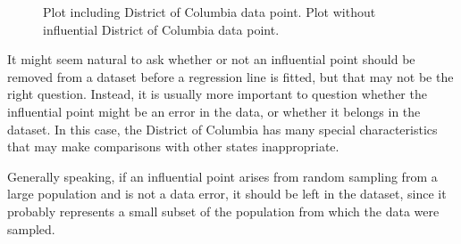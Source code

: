 \begin{figure}[h!]
	\centering
	\caption{ Plot including District of Columbia data point.  Plot without influential District of Columbia data point.}
	\label{infMortUS}
\end{figure}	

It might seem natural to ask whether or not an influential point should be removed from a dataset before a regression line is fitted, but that may not be the right question. Instead, it is usually more important to question whether the influential point might be an error in the data, or whether it belongs in the dataset. In this case, the District of Columbia has many special characteristics that may make comparisons with other states inappropriate. 

Generally speaking, if an influential point arises from random sampling from a large population and is not a data error, it should be left in the dataset, since it probably represents a small subset of the population from which the data were sampled. 

